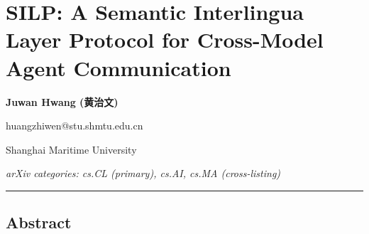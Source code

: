 \section{SILP: A Semantic Interlingua Layer Protocol for Cross-Model Agent Communication}\label{silp-a-semantic-interlingua-layer-protocol-for-cross-model-agent-communication}



\textbf{Juwan Hwang (黄治文)}

huangzhiwen@stu.shmtu.edu.cn

Shanghai Maritime University



\emph{arXiv categories: cs.CL (primary), cs.AI, cs.MA (cross-listing)}



\begin{center}\rule{0.5\linewidth}{0.5pt}\end{center}



\subsection{Abstract}\label{abstract}



